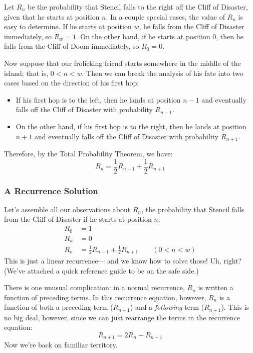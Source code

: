 Let $R_n$ be the probability that Stencil falls to the right off the
Cliff of Disaster, given that he starts at position $n$.  In a couple
special cases, the value of $R_n$ is easy to determine.  If he starts
at position $w$, he falls from the Cliff of Disaster immediately, so
$R_w = 1$.  On the other hand, if he starts at position $0$, then he
falls from the Cliff of Doom immediately, so $R_0 = 0$.

Now suppose that our frolicking friend starts somewhere in the middle
of the island; that is, $0 < n < w$.  Then we can break the analysis
of his fate into two cases based on the direction of his first hop:
%
\begin{itemize}

\item If his first hop is to the left, then he lands at position $n-1$
and eventually falls off the Cliff of Disaster with probability
$R_{n-1}$.

\item On the other hand, if his first hop is to the right, then he
lands at position $n+1$ and eventually falls off the Cliff of Disaster
with probability $R_{n+1}$.

\end{itemize}
%
Therefore, by the Total Probability Theorem, we have:
%
\[
R_n = \frac{1}{2} R_{n-1} + \frac{1}{2} R_{n+1}
\]

\subsubsection*{A Recurrence Solution}

Let's assemble all our observations about $R_n$, the probability that
Stencil falls from the Cliff of Disaster if he starts at position $n$:
%
\[
\begin{array}{rl}
R_0 & = 1 \\
R_w & = 0 \\
R_n & = \frac{1}{2} R_{n-1} + \frac{1}{2} R_{n+1} \qquad (0 < n < w)
\end{array}
\]
%
This is just a linear recurrence--- and we know how to solve those!
Uh, right?  (We've attached a quick reference guide to be on the safe
side.)

There is one unusual complication: in a normal recurrence, $R_n$ is
written a function of preceding terms.  In this recurrence equation,
however, $R_n$ is a function of both a preceding term ($R_{n-1}$) and
a \textit{following} term ($R_{n+1}$).  This is no big deal, however,
since we can just rearrange the terms in the recurrence equation:
%
\[
R_{n+1} = 2 R_n - R_{n-1}
\]
%
Now we're back on familiar territory.

